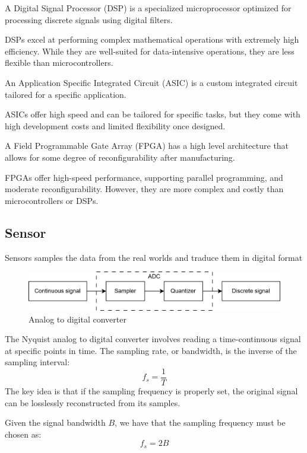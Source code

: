 \begin{definition}
    A Digital Signal Processor (DSP) is a specialized microprocessor optimized for processing discrete signals using digital filters.
\end{definition}
\noindent DSPs excel at performing complex mathematical operations with extremely high efficiency. 
While they are well-suited for data-intensive operations, they are less flexible than microcontrollers.

\begin{definition}
    An Application Specific Integrated Circuit (ASIC) is a custom integrated circuit tailored for a specific application.
\end{definition}
\noindent ASICs offer high speed and can be tailored for specific tasks, but they come with high development costs and limited flexibility once designed.

\begin{definition}
    A Field Programmable Gate Array (FPGA) has a high level architecture that allows for some degree of reconfigurability after manufacturing.
\end{definition}
\noindent FPGAs offer high-speed performance, supporting parallel programming, and moderate reconfigurability. 
However, they are more complex and costly than microcontrollers or DSPs.

\subsection{Sensor}
Sensors samples the data from the real worlds and traduce them in digital format
\begin{figure}[H]
    \centering
    \includegraphics[width=0.75\linewidth]{images/iot4.png}
    \caption{Analog to digital converter}
\end{figure}

The Nyquist analog to digital converter involves reading a time-continuous signal at specific points in time. 
The sampling rate, or bandwidth, is the inverse of the sampling interval:
\[f_s=\dfrac{1}{T}\]
\noindent The key idea is that if the sampling frequency is properly set, the original signal can be losslessly reconstructed from its samples.
\begin{theorem}
    Given the signal bandwidth $B$, we have that the sampling frequency must be chosen as:
    \[f_s=2B\]
\end{theorem}
 
